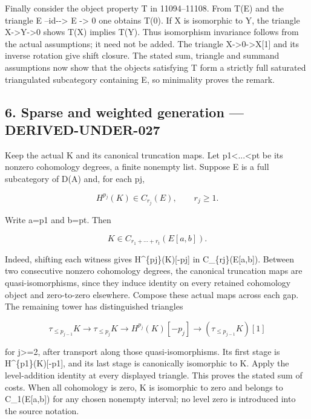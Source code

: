 Finally consider the object property T in 11094–\allowbreak{}11108. From T(E)\allowbreak{} and the triangle E --id-\allowbreak{}-> E \allowbreak{}-> 0 one obtains T(0)\allowbreak{}. If X is isomorphic to Y,\allowbreak{} the triangle X\allowbreak{}->Y\allowbreak{}->0 shows T(X)\allowbreak{} implies T(Y)\allowbreak{}. Thus isomorphism invariance follows from the actual assumptions; it need not be added. The triangle X\allowbreak{}->0\allowbreak{}->X[1]\allowbreak{} and its inverse rotation give shift closure. The stated sum,\allowbreak{} triangle and summand assumptions now show that the objects satisfying T form a strictly full saturated triangulated subcategory containing E,\allowbreak{} so minimality proves the remark.

\subsection{6. Sparse and weighted generation --- DERIVED-UNDER-027}\label{proofs-10691-11108-sparse-and-weighted-generation-derived-under-027}

Keep the actual K and its canonical truncation maps. Let p1\textless...\textless pt be its nonzero cohomology degrees,\allowbreak{} a finite nonempty list. Suppose E is a full subcategory of D(A)\allowbreak{} and,\allowbreak{} for each pj,\allowbreak{}

\[
 H^{p_j}(K)\in C_{r_j}(E),\qquad r_j\geq1.
\]

Write a\allowbreak{}=p1 and b\allowbreak{}=pt. Then

\[
 K\in C_{r_1+\cdots+r_t}(E[a,b]).
\]

Indeed,\allowbreak{} shifting each witness gives H\textasciicircum{}\{pj\}(K)\allowbreak{}[-pj]\allowbreak{} in C\_\allowbreak{}\{rj\}(E[a,\allowbreak{}b]\allowbreak{})\allowbreak{}. Between two consecutive nonzero cohomology degrees,\allowbreak{} the canonical truncation maps are quasi-isomorphisms,\allowbreak{} since they induce identity on every retained cohomology object and zero-to-zero elsewhere. Compose these actual maps across each gap. The remaining tower has distinguished triangles

\[
 \tau_{\leq p_{j-1}}K\longrightarrow\tau_{\leq p_j}K
 \longrightarrow H^{p_j}(K)[-p_j]
 \longrightarrow(\tau_{\leq p_{j-1}}K)[1]
\]

for j>\allowbreak{}=2,\allowbreak{} after transport along those quasi-isomorphisms. Its first stage is H\textasciicircum{}\{p1\}(K)\allowbreak{}[-p1]\allowbreak{},\allowbreak{} and its last stage is canonically isomorphic to K. Apply the level-addition identity at every displayed triangle. This proves the stated sum of costs. When all cohomology is zero,\allowbreak{} K is isomorphic to zero and belongs to C\_\allowbreak{}1(E[a,\allowbreak{}b]\allowbreak{})\allowbreak{} for any chosen nonempty interval; no level zero is introduced into the source notation.

